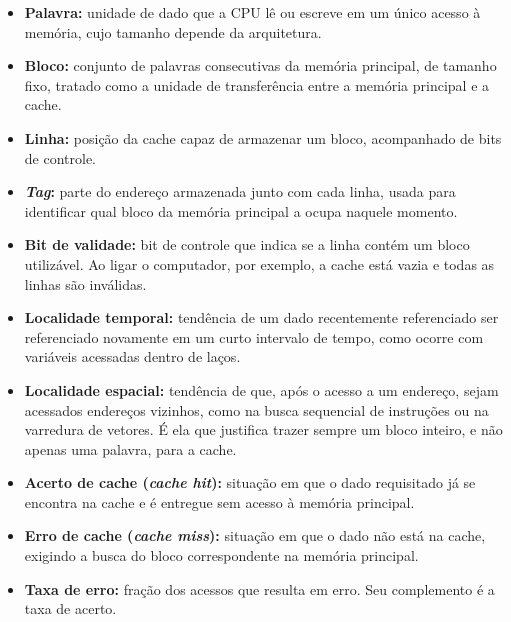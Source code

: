 \documentclass[12pt]{article}
\begin{document}
\begin{itemize}
  \renewcommand{\labelitemi}{$\triangleright$}
  \setlength{\itemsep}{3pt}

  \item \textbf{Palavra:} unidade de dado que a CPU lê ou escreve em um
  único acesso à memória, cujo tamanho depende da arquitetura.

  \item \textbf{Bloco:} conjunto de palavras consecutivas da memória
  principal, de tamanho fixo, tratado como a unidade de transferência
  entre a memória principal e a cache.

  \item \textbf{Linha:} posição da cache capaz de armazenar um bloco,
  acompanhado de bits de controle.

  \item \textbf{\textit{Tag}:} parte do endereço armazenada junto com cada
  linha, usada para identificar qual bloco da memória principal a ocupa
  naquele momento.

  \item \textbf{Bit de validade:} bit de controle que indica se a linha
  contém um bloco utilizável. Ao ligar o computador, por exemplo, a cache
  está vazia e todas as linhas são inválidas.

  \item \textbf{Localidade temporal:} tendência de um dado recentemente
  referenciado ser referenciado novamente em um curto intervalo de tempo,
  como ocorre com variáveis acessadas dentro de laços.

  \item \textbf{Localidade espacial:} tendência de que, após o acesso a um
  endereço, sejam acessados endereços vizinhos, como na busca sequencial
  de instruções ou na varredura de vetores. É ela que justifica trazer
  sempre um bloco inteiro, e não apenas uma palavra, para a cache.

  \item \textbf{Acerto de cache (\textit{cache hit}):} situação em que o dado
  requisitado já se encontra na cache e é entregue sem acesso à memória
  principal.

  \item \textbf{Erro de cache (\textit{cache miss}):} situação em que o dado não
  está na cache, exigindo a busca do bloco correspondente na memória
  principal.

  \item \textbf{Taxa de erro:} fração dos acessos que resulta em erro.
  Seu complemento é a taxa de acerto.
  
  \cite{tanenbaum2013} \cite{stallings2017}
\end{itemize}
\end{document}
